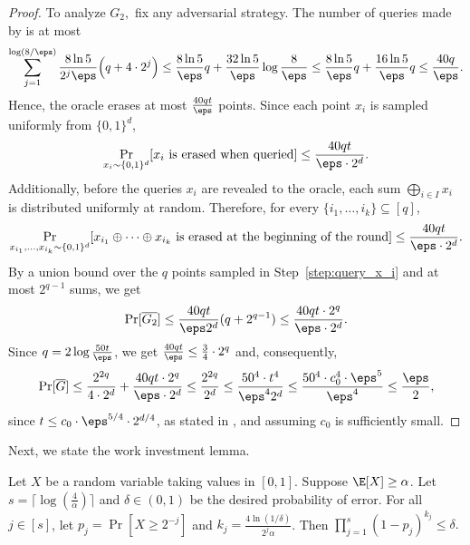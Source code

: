 \documentclass{toc}
\begin{document}
\begin{proof}
To analyze $G_2,$ fix any adversarial strategy. The number of queries made by  is at most 
\begin{equation}\label{eq:num-queries}
    \sum_{j=1}^{ \log(8/\eps) } \frac{8\ln 5}{2^j \eps} \Big(q + 4 \cdot 2^j \Big) \leq \frac{8\ln 5}{\eps} q + \frac{32 \ln 5}{\eps} \log\frac 8\eps \leq \frac{8\ln 5}{\eps} q + \frac{16 \ln 5}{\eps}q \leq \frac{40 q}{\eps }.
\end{equation}
Hence, the oracle erases at most $ \frac{40qt}{\eps}$ points. Since each point $x_i$ is sampled uniformly from $\{0,1\}^d$,
\begin{equation*}
    \Pr_{x_i \sim \{0,1\}^d} [x_i \textnormal{ is erased when queried}] \leq  \frac{40qt}{\eps\cdot 2^d}.
\end{equation*}
Additionally, before the queries $x_i$ are revealed to the oracle, each sum $\bigoplus_{i \in I}x_i$ is distributed uniformly at random. Therefore, for every $\{i_1, \dots, i_k\} \subseteq [q]$,
\begin{equation*}
    \Pr_{x_{i_1}, \dots,  x_{i_{k}} \sim \{0,1\}^d} [x_{i_1} \oplus \dots \oplus x_{i_{k}} \textnormal{ is erased at the beginning of the round}] \leq \frac{40qt}{\eps\cdot 2^d}.
\end{equation*}
By a union bound over the $q$ points sampled in Step~\ref{step:query_x_i} and at most $2^{q-1}$ sums, we get 
\[
\Pr[\overline{G_2}] \leq  \frac{40qt}{\eps  2^d}(q+2^{q-1}) \leq  \frac{40  qt \cdot 2^q }{\eps \cdot   2^d}.
\]
Since $q = 2\log\frac{50t}\eps$, we get  $\frac{40qt}{\eps} \leq \frac{3}{4} \cdot 2^q$ and, consequently,
\begin{align*}
     \Pr[\overline{G}] \leq \frac{2^{2q}}{4 \cdot 2^d} + \frac{40qt\cdot 2^q }{\eps \cdot  2^d}  
     \leq \frac{ 2^{2q}}{2^d} \leq \frac{ 50^4 \cdot t^4}{\eps^4 2^d} \leq \frac{50^4 \cdot c_0^4 \cdot \eps^5}{\eps^4} \leq \frac{\eps}{2},
\end{align*}
since $t \leq c_0 \cdot \eps^{5/4} \cdot 2^{d/4}$, as stated in , and assuming $c_0$ is sufficiently small.
\end{proof}

Next, we state the work investment lemma.
\begin{lemma} \label{lem:work}
Let $X$ be a random variable taking values in $[0,1]$. Suppose $\E[X] \geq \alpha$. Let $s = \lceil \log(\frac{4}{\alpha}) \rceil$ and $\delta \in (0,1)$ be the desired probability of error. For all $j \in [s]$, let $p_j = \Pr[X \geq 2^{-j}]$ and $k_j =  \frac{4\ln(1/\delta)}{2^j\alpha}$. Then
$
    \prod_{j=1}^{s}(1-p_j)^{k_j} \leq \delta.
$
\end{lemma}
\end{document}
